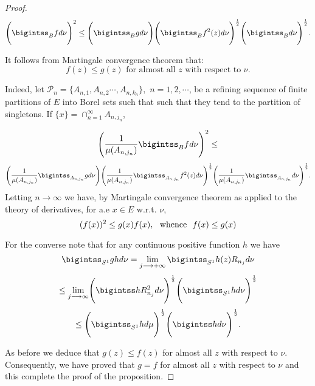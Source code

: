 \documentclass{amsart}
\theoremstyle{definition}
\theoremstyle{remark}
\numberwithin{equation}{section}
\newcommand{\1}{\mathbb{1}}
\begin{document}
\begin{proof}
$$\Biggl(\bigintss_{B} f  d\nu\Biggr)^2 \leq
\Biggl(\bigintss_{B}  g d\nu\Biggr) \Biggl(\bigintss_{B} f^2(z) d\nu \Biggr)^{\frac{1}{2}}
\Biggl(\bigintss_{B} d\nu\Biggr)^{\frac{1}{2}}.$$

It follows from Martingale convergence theorem that:
$$ f(z) \leq g(z) {\textrm {~for~almost~all~}}z {\textrm{~with~respect~to~}} \nu.$$

Indeed, let ${{\mathcal  P}}_n = \{A_{n,1}, A_{n,2}\cdots, A_{n, k_n}\},$  $n =1,2,\cdots$, be a refining sequence of finite partitions of $E$ into Borel sets such that such that they tend to the partition of singletons. If $\{x\} = \cap_{n=1}^\infty A_{n,j_n}$,

$$\Biggl(\frac{1}{\mu (A_{n, j_n})}\bigintss_{B} f  d\nu\Biggr)^2 \leq$$
$$
\Biggl(\frac{1}{\mu (A_{n, j_n})}\bigintss_{A_{n,j_n}}  g d\nu\Biggr) \Biggl(\frac{1}{\mu (A_{n, j_n})}\bigintss_{A_{n,j_n}} f^2(z) d\nu \Biggr)^{\frac{1}{2}}
\Biggl(\frac{1}{\mu (A_{n, j_n})}\bigintss_{A_{n,j_n}} d\nu\Biggr)^{\frac{1}{2}}.$$
Letting $n\rightarrow \infty$ we have, by Martingale convergence theorem as applied to the theory of derivatives,
for a.e $x \in E$ w.r.t. $\nu$,
$$(f(x))^2 \leq g(x) f(x), ~~{\rm{whence}} ~~f(x)\leq g(x)$$

\noindent{}For the converse note that for any continuous positive function $h$ we have
$$\bigintss_{S^1} g h d\nu = \lim_{j \longrightarrow +\infty}\bigintss_{S^1} h(z) R_{n_j}   d\nu $$
$$ \leq   \lim_{j \longrightarrow \infty} \Biggl(\bigintss h R_{n_j}^2 d\nu\Biggr)^{\frac{1}{2}} \Biggl(\bigintss_{S^1} h d\nu\Biggr)^{\frac{1}{2}}$$
$$ \leq  \Biggl(\bigintss_{S^1} h d\mu\Biggr)^{\frac{1}{2}}  \Biggl(\bigintss h  d\nu\Biggr)^{\frac{1}{2}}.$$

\noindent{}As before we deduce that $g(z) \leq f(z)$ for almost all $z$ with respect to $\nu$.
Consequently, we have proved that $g=f$ for almost all $z$ with respect to $\nu$ and this complete the proof of the proposition.
\end{proof}
\end{document}
